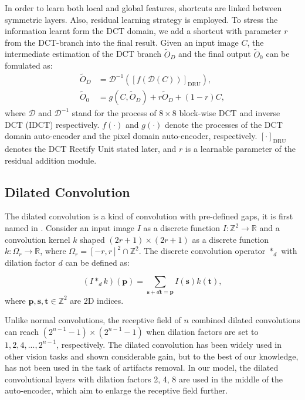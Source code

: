 \documentclass{article}
\begin{document}
In order to learn both local and global features, shortcuts are linked between
symmetric layers. Also, residual learning strategy is employed.
To stress the information learnt form the DCT domain,
we add a shortcut with parameter $r$ from the DCT-branch into the final result.
Given an input image $C$, the intermediate estimation of the DCT branch
$\tilde O_D$ and the final output $\tilde O_0$ can be fomulated as:
\begin{equation}
  \begin{aligned}
    \tilde O_D &= \mathcal{D}^{-1}([f(\mathcal{D}(C))]_\text{DRU}),\\
    \tilde O_0 &= g(C, \tilde O_D) + r \tilde O_D + (1-r) C,
  \end{aligned}
\end{equation}
where $\mathcal{D}$ and $\mathcal{D}^{-1}$ stand for the process of
$8 \times 8$ block-wise DCT and inverse DCT (IDCT) respectively. $f(\cdot)$
and $g(\cdot)$ denote the processes of the DCT domain auto-encoder and
the pixel domain auto-encoder, respectively. $[\cdot]_\text{DRU}$ denotes
the DCT Rectify Unit stated later, and $r$ is a learnable parameter of
the residual addition module.
\vspace{-0.2cm}

\subsection{Dilated Convolution}
\label{ssec:diconv}

The dilated convolution is a kind of convolution with pre-defined gaps,
it is first named in \cite{YuKoltun2016}. Consider
an input image $I$ as a discrete function $I:\mathbb{Z}^2 \rightarrow\mathbb{R}$
and a convolution kernel $k$ shaped $(2r+1)\times(2r+1)$ as a discrete function
$k:\Omega_r\rightarrow\mathbb{R}$, where $\Omega_r=[-r,r]^2\cap\mathbb{Z}^2$.
The discrete convolution operator $*_d$ with dilation factor $d$ can
be defined as:

\begin{equation}
  (I*_dk)(\mathbf{p}) =
  \sum_{\mathbf{s}+d\mathbf{t}=\mathbf{p}}{I(\mathbf{s})k(\mathbf{t})},
\end{equation}
where $\mathbf{p}, \mathbf{s}, \mathbf{t} \in \mathbb{Z}^2$ are 2D indices.

Unlike normal convolutions, the receptive field of $n$ combined
dilated convolutions can reach $(2^{n-1}-1) \times (2^{n-1}-1)$ when
dilation factors are set to $1, 2, 4, ..., 2^{n-1}$, respectively.
The dilated convolution has been widely used in other vision tasks
\cite{chen2016deeplab,wang2017large} and shown considerable gain,
but to the best of our knowledge, has not been used in the
task of artifacts removal. In our model, the dilated convolutional layers
with dilation factors 2, 4, 8 are used in the middle of the auto-encoder,
which aim to enlarge the receptive field further.
\end{document}
